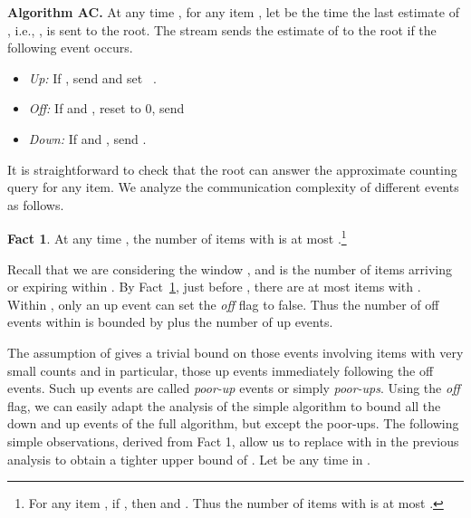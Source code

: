 \documentclass[proceedings]{stacs}
\theoremstyle{definition}\newtheorem{fact}{Fact}
\begin{document}
\vspace{.5ex}
\begin{center}
\begin{minipage}{.9\textwidth}
\hrulefill

{\bf Algorithm AC.}
At any time , for any item ,  {let
  {} be the time the
last estimate of , i.e., , is
sent to the root.}
The stream sends the estimate of  to the root
if the following event occurs.
 \begin{itemize}
 \item
 {\it Up:} \hspace{3ex}If ,
 send  and set ~.
 \item
 {\it Off:} \hspace{2.7ex}If
   and ,
{reset  to 0,
  send }\\
  \mbox{}\hspace{.5in}{and set .}
 \item
 {\it Down:} If  and ,
 send .
 \end{itemize}
\vspace*{-.1in}
\hrulefill
 \end{minipage}
\end{center}
\vspace*{.05in}
\vspace{.5ex}










It is straightforward to check that the root can
answer the approximate counting query for any item.
We analyze the communication complexity of different events as follows.

\begin{fact} \label{lem:rj}
At any time , the number of items  with  is at most
.\footnote{For any item , if ,
  then  and
  .  Thus
  the number of items  with  is at most
  .
} \end{fact}

  {
Recall that we are considering the window , and
 is the number of items arriving or expiring within .}
By Fact~\ref{lem:rj},
just before ,
there are at most  items with .
Within , only an up event can set the {\em off}\/ flag
to false.
Thus the number of off events within  
is bounded by  plus the number of up events.



\vspace{.5ex}
The assumption of  gives a trivial bound on
 those events involving  items with very small counts and in
particular, those up events immediately following the off events.
Such up events are called {\em poor-up} events or simply {\em poor-ups}.
Using the {\em off}\/ flag, we can easily adapt
the analysis of the simple algorithm to bound
all the down and up events of the full algorithm,
but except the poor-ups. The following simple
observations, derived from Fact 1, allow us to replace
 with  in the previous analysis
to obtain a tighter upper bound of
.  Let  be any time in .
\end{document}
